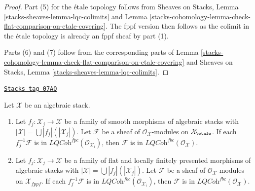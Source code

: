 \begin{proof}
\medskip\noindent
Part (5) for the \'etale topology follows from
Sheaves on Stacks, Lemma \ref{stacks-sheaves-lemma-lqc-colimits} and
Lemma \ref{stacks-cohomology-lemma-check-flat-comparison-on-etale-covering}.
The fppf version then follows as the colimit in the \'etale
topology is already an fppf sheaf by part (1).

\medskip\noindent
Parts (6) and (7) follow from the corresponding parts of
Lemma \ref{stacks-cohomology-lemma-check-flat-comparison-on-etale-covering} and
Sheaves on Stacks, Lemma \ref{stacks-sheaves-lemma-lqc-colimits}.
\end{proof}

\begin{lemma}
\label{stacks-cohomology-lemma-check-lqc-fbc-on-covering}
\href{https://stacks.math.columbia.edu/tag/07AQ}{\texttt{Stacks tag 07AQ}}

Let $\mathcal{X}$ be an algebraic stack.
\begin{enumerate}
\item Let $f_j : \mathcal{X}_j \to \mathcal{X}$ be a family of smooth
morphisms of algebraic stacks with
$|\mathcal{X}| =\bigcup |f_j|(|\mathcal{X}_j|)$.
Let $\mathcal{F}$ be a sheaf of $\mathcal{O}_\mathcal{X}$-modules
on $\mathcal{X}_\etale$. If each $f_j^{-1}\mathcal{F}$
is in $\textit{LQCoh}^{fpc}(\mathcal{O}_{\mathcal{X}_i})$, then
$\mathcal{F}$ is in
$\textit{LQCoh}^{fbc}(\mathcal{O}_\mathcal{X})$.
\item  Let $f_j : \mathcal{X}_j \to \mathcal{X}$ be a family of flat
and locally finitely presented morphisms of algebraic stacks with
$|\mathcal{X}| =\bigcup |f_j|(|\mathcal{X}_j|)$.
Let $\mathcal{F}$ be a sheaf of $\mathcal{O}_\mathcal{X}$-modules
on $\mathcal{X}_{fppf}$. If each $f_j^{-1}\mathcal{F}$
is in $\textit{LQCoh}^{fbc}(\mathcal{O}_{\mathcal{X}_i})$, then
$\mathcal{F}$ is in $\textit{LQCoh}^{fbc}(\mathcal{O}_\mathcal{X})$.
\end{enumerate}
\end{lemma}

